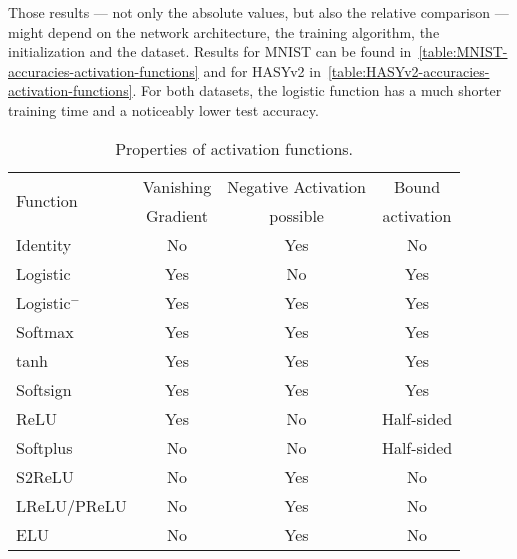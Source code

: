 Those results --- not only the absolute values, but also the relative
comparison --- might depend on the network architecture, the training
algorithm, the initialization and the dataset. Results for MNIST can be found
in~\cref{table:MNIST-accuracies-activation-functions} and for HASYv2
in~\cref{table:HASYv2-accuracies-activation-functions}. For both datasets, the
logistic function has a much shorter training time and a noticeably lower test
accuracy.

\begin{table}[H]
    \centering
    \begin{tabular}{lccc}
    \toprule
    \multirow{2}{*}{Function} & Vanishing  & Negative Activation & Bound \\
                  & Gradient       & possible & activation \\\midrule
    Identity      & \cellcolor{green!25}No    & \cellcolor{green!25}  Yes    & \cellcolor{green!25}No  \\
    Logistic      & \cellcolor{red!25} Yes    & \cellcolor{red!25}   No      & \cellcolor{red!25}  Yes \\
    Logistic$^-$  & \cellcolor{red!25} Yes    & \cellcolor{green!25}  Yes    & \cellcolor{red!25}  Yes \\
    Softmax        & \cellcolor{red!25} Yes    & \cellcolor{green!25}  Yes    & \cellcolor{red!25}  Yes \\
    tanh          & \cellcolor{red!25} Yes    & \cellcolor{green!25}  Yes    & \cellcolor{red!25}  Yes \\
    Softsign      & \cellcolor{red!25} Yes    & \cellcolor{green!25}Yes      & \cellcolor{red!25}   Yes \\
    ReLU          & \cellcolor{yellow!25}Yes\footnotemark & \cellcolor{red!25} No & \cellcolor{yellow!25}Half-sided \\
    Softplus      & \cellcolor{green!25}No    & \cellcolor{red!25}   No      & \cellcolor{yellow!25}Half-sided \\
    S2ReLU        & \cellcolor{green!25}No    & \cellcolor{green!25}Yes      & \cellcolor{green!25} No \\
    LReLU/PReLU   & \cellcolor{green!25}No    & \cellcolor{green!25}Yes      & \cellcolor{green!25} No \\
    ELU           & \cellcolor{green!25}No    & \cellcolor{green!25}Yes      & \cellcolor{green!25} No \\
    \bottomrule
    \end{tabular}
    \caption[Activation function properties]{Properties of activation functions.}
    \label{table:properties-of-activation-functions}
\end{table}


